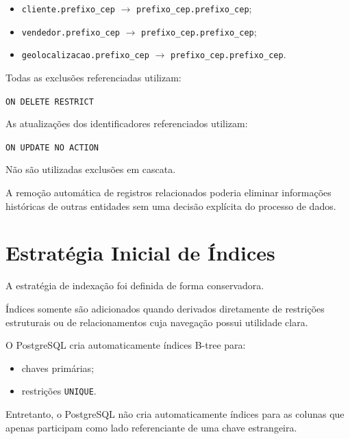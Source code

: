 \documentclass[12pt,a4paper]{article}
\begin{document}
{\begin{itemize}[leftmargin=1.2cm]
		\item \texttt{cliente.prefixo\_cep}
		$\rightarrow$
		\texttt{prefixo\_cep.prefixo\_cep};
		
		\item \texttt{vendedor.prefixo\_cep}
		$\rightarrow$
		\texttt{prefixo\_cep.prefixo\_cep};
		
		\item \texttt{geolocalizacao.prefixo\_cep}
		$\rightarrow$
		\texttt{prefixo\_cep.prefixo\_cep}.
		
	\end{itemize}
	
	Todas as exclusões referenciadas utilizam:
	
	\begin{center}
		\texttt{ON DELETE RESTRICT}
	\end{center}
	
	As atualizações dos identificadores referenciados utilizam:
	
	\begin{center}
		\texttt{ON UPDATE NO ACTION}
	\end{center}
	
	Não são utilizadas exclusões em cascata.
	
	A remoção automática de registros relacionados poderia eliminar
	informações históricas de outras entidades sem uma decisão explícita
	do processo de dados.
	
	\section{Estratégia Inicial de Índices}
	
	A estratégia de indexação foi definida de forma conservadora.
	
	Índices somente são adicionados quando derivados diretamente de
	restrições estruturais ou de relacionamentos cuja navegação possui
	utilidade clara.
	
	O PostgreSQL cria automaticamente índices B-tree para:
	
	\begin{itemize}[leftmargin=1.2cm]
		\item chaves primárias;
		\item restrições \texttt{UNIQUE}.
	\end{itemize}
	
	Entretanto, o PostgreSQL não cria automaticamente índices para as
	colunas que apenas participam como lado referenciante de uma chave
	estrangeira.
	
}
\end{document}
